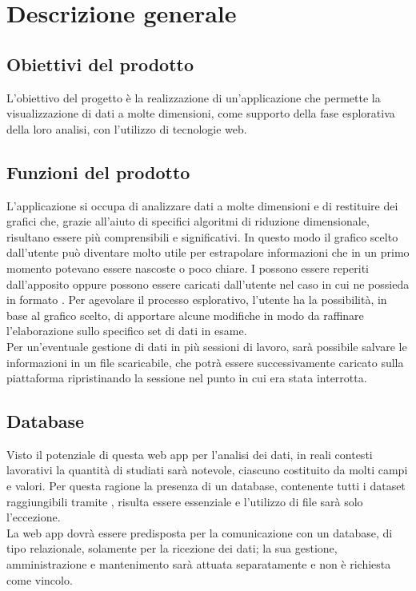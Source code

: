 \section{Descrizione generale}
\subsection{Obiettivi del prodotto}
L'obiettivo del progetto è la realizzazione di un'applicazione che permette la visualizzazione di dati a molte dimensioni, come supporto della fase esplorativa della loro analisi, con l'utilizzo di tecnologie web.
\subsection{Funzioni del prodotto}
L'applicazione si occupa di analizzare dati a molte dimensioni e di restituire dei grafici che, grazie all'aiuto di specifici algoritmi di riduzione dimensionale, risultano essere più comprensibili e significativi. In questo modo il grafico scelto dall'utente può diventare molto utile per estrapolare informazioni che in un primo momento potevano essere nascoste o poco chiare. I  possono essere reperiti dall'apposito  oppure possono essere caricati dall'utente nel caso in cui ne possieda in formato . Per agevolare il processo esplorativo, l'utente ha la possibilità, in base al grafico scelto, di apportare alcune modifiche in modo da raffinare l'elaborazione sullo specifico set di dati in esame.\\ Per un'eventuale gestione di dati in più sessioni di lavoro, sarà possibile salvare le informazioni in un file scaricabile, che potrà essere successivamente caricato sulla piattaforma ripristinando la sessione nel punto in cui era stata interrotta.

\subsection{Database}
Visto il potenziale di questa web app per l'analisi dei dati, in reali contesti lavorativi la quantità di  studiati sarà notevole, ciascuno costituito da molti campi e valori. Per questa ragione la presenza di un database, contenente tutti i dataset raggiungibili tramite , risulta essere essenziale e l'utilizzo di file  sarà solo l'eccezione. \\
La web app dovrà essere predisposta per la comunicazione con un database, di tipo relazionale, solamente per la ricezione dei dati; la sua gestione, amministrazione e mantenimento sarà attuata separatamente e non è richiesta come vincolo.

